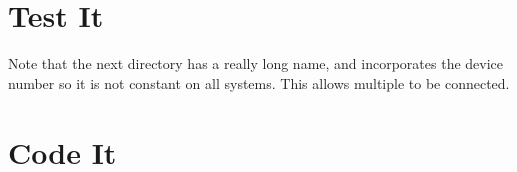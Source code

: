 
\section{Test It}








Note that the next directory has a really long name, and incorporates the device number so it is not constant on all systems.  This allows multiple to be connected.





\section{Code It}

